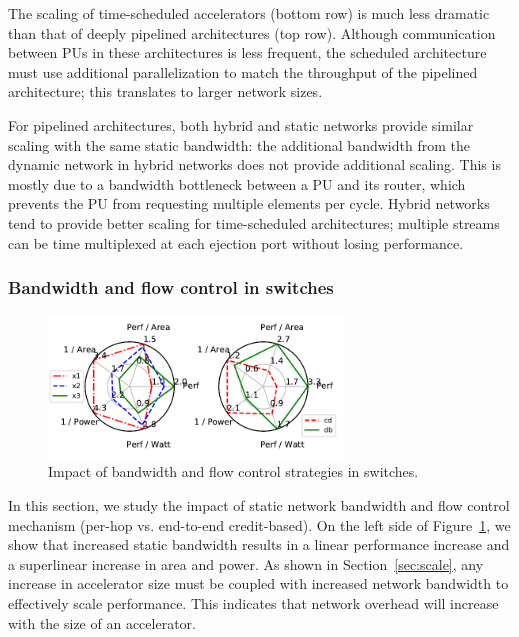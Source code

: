 The scaling of time-scheduled accelerators (bottom row) is much less dramatic than that of deeply pipelined architectures (top row). 
Although communication between PUs in these architectures is less frequent, the scheduled architecture must use additional parallelization to match the throughput of the pipelined architecture; this translates to larger network sizes. 

For pipelined architectures, both hybrid and static networks provide similar scaling with the same static bandwidth:
the additional bandwidth from the dynamic network in hybrid networks does not provide additional scaling. 
This is mostly due to a bandwidth bottleneck between a PU and its router, which prevents the PU from requesting multiple elements per cycle.
Hybrid networks tend to provide better scaling for time-scheduled architectures; multiple streams can be time multiplexed at each ejection port without losing performance.

\subsubsection{Bandwidth and flow control in switches}

\begin{figure}
  \centering
\includegraphics[width=0.7\textwidth]{network/figs/radar_switch.pdf}
  \caption{
    Impact of bandwidth and flow control strategies in switches.}\label{fig:radar_switch}
\end{figure}

In this section, we study the impact of static network bandwidth and flow control mechanism (per-hop vs. end-to-end credit-based). 
On the left side of Figure~\ref{fig:radar_switch}, we show that increased static bandwidth results in a linear performance increase and a superlinear increase in area and power. 
As shown in Section~\ref{sec:scale}, any increase in accelerator size must be coupled with increased network bandwidth to effectively scale performance. 
This indicates that network overhead will increase with the size of an accelerator.

